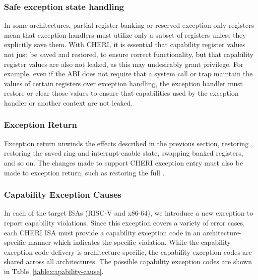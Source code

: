 \subsubsection{Safe exception state handling}

In some architectures, partial register banking or reserved exception-only
registers mean that exception handlers must utilize only a subset of
registers unless they explicitly save them.
With CHERI, it is essential that capability register values not just be saved
and restored, to ensure correct functionality, but that capability register
values are also not leaked, as this may undesirably grant privilege.
For example, even if the ABI does not require that a system call or trap
maintain the values of certain registers over exception handling, the
exception handler must restore or clear those values to ensure that
capabilities used by the exception handler or another context are not leaked.

\subsubsection{Exception Return}

Exception return unwinds the effects described in the previous section,
restoring \PC{}, restoring the saved ring and interrupt-enable
state, swapping banked registers, and so on.
The changes made to support CHERI exception entry must also be made to
exception return, such as restoring the full \PCC{}.

\subsubsection{Capability Exception Causes}
\label{sec:capability_exception_causes}

In each of the target ISAs (RISC-V and x86-64), we introduce a new
exception to report capability violations.
Since this exception covers a variety of error cases, each CHERI ISA
must provide a capability exception code in an architecture-specific
manner which indicates the specific violation.
While the capability exception code delivery is architecture-specific,
the capability exception codes are shared across all architectures.
The possible capability exception codes are shown in Table~\ref{table:capability-cause}.

